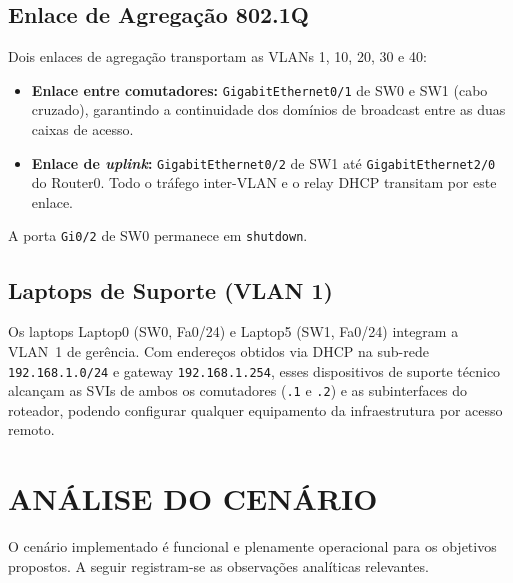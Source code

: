 \subsection{Enlace de Agregação 802.1Q}

Dois enlaces de agregação transportam as VLANs 1, 10, 20, 30 e 40:

\begin{itemize}[leftmargin=2em]
  \item \textbf{Enlace entre comutadores:} \texttt{GigabitEthernet0/1} de SW0
        e SW1 (cabo cruzado), garantindo a continuidade dos domínios de broadcast
        entre as duas caixas de acesso.
  \item \textbf{Enlace de \textit{uplink}:} \texttt{GigabitEthernet0/2} de SW1
        até \texttt{GigabitEthernet2/0} do Router0. Todo o tráfego inter-VLAN e
        o relay DHCP transitam por este enlace.
\end{itemize}

A porta \texttt{Gi0/2} de SW0 permanece em \texttt{shutdown}.

\subsection{Laptops de Suporte (VLAN 1)}

\begin{sloppypar}
Os laptops Laptop0 (SW0, Fa0/24) e Laptop5 (SW1, Fa0/24)
integram a VLAN~1 de gerência. Com endereços obtidos via DHCP na sub-rede
\texttt{192.168.1.0/24} e gateway \texttt{192.168.1.254}, esses dispositivos
de suporte técnico alcançam as SVIs de ambos os comutadores
(\texttt{.1} e \texttt{.2}) e as subinterfaces do roteador, podendo configurar
qualquer equipamento da infraestrutura por acesso remoto.
\end{sloppypar}

\section{ANÁLISE DO CENÁRIO}

O cenário implementado é funcional e plenamente operacional para os objetivos
propostos. A seguir registram-se as observações analíticas relevantes.

